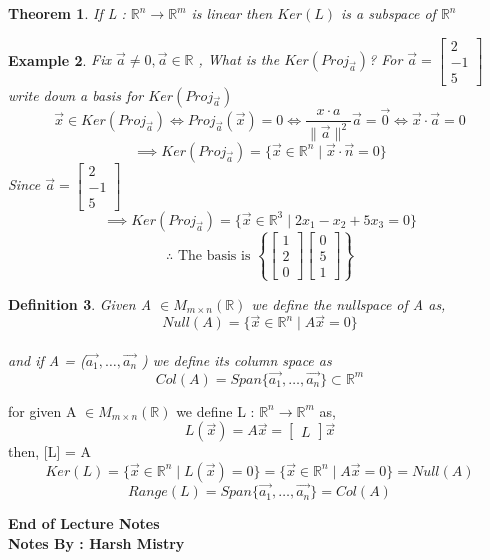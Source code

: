 \documentclass{article}
\newcounter{lecnum}
\newtheorem{theorem}{Theorem}[lecnum]
\newtheorem{ex}[theorem]{Example}
\newtheorem{definition}[theorem]{Definition}
\begin{document}
 \begin{theorem}
 If L : \(\mathbb{R}^n \rightarrow \mathbb{R}^m\) is linear then \(Ker(L)\) is a subspace of \(\mathbb{R}^n\) 
 \end{theorem}
 
 \newpage
 
 \begin{ex}
 Fix \(\vec{a} \neq 0, \vec{a} \in \mathbb{R}\) , What is the \(Ker(Proj_{\vec{a}})\)? For \( \vec{a} = \begin{bmatrix}
 2 \\ -1 \\ 5 \end{bmatrix} \) write down a basis for \(Ker(Proj_{\vec{a}})\) \\
 \[\vec{x} \in Ker(Proj_{\vec{a}}) \iff Proj_{\vec{a}}(\vec{x}) = 0 \iff \frac{x \cdot a }{\|\vec{a}\|^2}\vec{a} = \vec{0} \iff \vec{x} \cdot \vec{a} = 0\]
 \[\implies Ker(Proj_{\vec{a}}) = \{ \vec{x} \in \mathbb{R}^n \mid \vec{x} \cdot \vec{n}  = 0 \} \]
 Since \( \vec{a} = \begin{bmatrix} 2 \\ -1 \\5 \end{bmatrix} \) 
 \[\implies Ker(Proj_{\vec{a}}) = \{ \vec{x} \in \mathbb{R}^3 \mid 2x_1-x_2+5x_3 =0 \} \]
 \[\therefore \text{ The basis is } \left\{\begin{bmatrix}1 \\ 2 \\ 0 \end{bmatrix} \begin{bmatrix} 0 \\ 5 \\ 1\end{bmatrix} \right\} \]
 \end{ex}
 
\begin{definition}
Given A \( \in M_{m\times n} (\mathbb{R})\) we define the nullspace of A as, \\
\[Null(A) = \{\vec{x} \in \mathbb{R}^n \mid A\vec{x} = 0 \} \]\\
and if A = (\(\vec{a_1} , \ldots , \vec{a_n} \) ) we define its column space as \\
\[Col (A) = Span \{\vec{a_1} , \ldots , \vec{a_n}\} \subset \mathbb{R}^m \]
 \end{definition} 
 
 for given A \( \in M_{m\times n } (\mathbb{R}) \) we define L : \( \mathbb{R}^n \rightarrow \mathbb{R}^m\) as, 
 \[L(\vec{x}) = A \vec{x} = \begin{bmatrix} L\end{bmatrix} \vec{x} \]
 then, [L] = A \\
 \[Ker(L) = \{ \vec{x} \in \mathbb{R}^n \mid L(\vec{x}) = 0 \} = \{ \vec{x} \in \mathbb{R}^n \mid A\vec{x} = 0 \} = Null(A) \]
\[Range(L) = Span\{\vec{a_1} , \ldots , \vec{a_n}\} = Col(A) \]

\begin{center}
\textbf{End of Lecture Notes} \\
\textbf{Notes By : Harsh Mistry}
\end{center}
\end{document}
